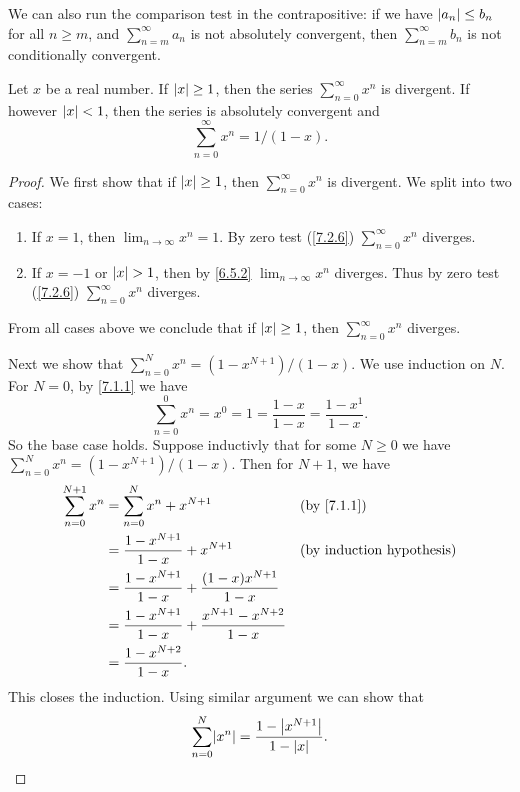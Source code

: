\begin{note}
  We can also run the comparison test in the contrapositive:
  if we have \(\left\lvert a_n\right\rvert \leq b_n\) for all \(n \geq m\), and \(\sum_{n = m}^\infty a_n\) is not absolutely convergent, then \(\sum_{n = m}^\infty b_n\) is not conditionally convergent.
\end{note}

\begin{lem}\label{7.3.3}
  Let \(x\) be a real number.
  If \(\left\lvert x\right\rvert \geq 1\), then the series \(\sum_{n = 0}^\infty x^n\) is divergent.
  If however \(\left\lvert x\right\rvert < 1\), then the series is absolutely convergent and
  \[
    \sum_{n = 0}^\infty x^n = 1 / (1 - x).
  \]
\end{lem}

\begin{proof}
  We first show that if \(\left\lvert x\right\rvert \geq 1\), then \(\sum_{n = 0}^\infty x^n\) is divergent.
  We split into two cases:
  \begin{enumerate}
    \item If \(x = 1\), then \(\lim_{n \to \infty} x^n = 1\). By zero test (\cref{7.2.6}) \(\sum_{n = 0}^\infty x^n\) diverges.
    \item If \(x = -1\) or \(\left\lvert x\right\rvert > 1\), then by \cref{6.5.2} \(\lim_{n \to \infty} x^n\) diverges.
          Thus by zero test (\cref{7.2.6}) \(\sum_{n = 0}^\infty x^n\) diverges.
  \end{enumerate}
  From all cases above we conclude that if \(\left\lvert x\right\rvert \geq 1\), then \(\sum_{n = 0}^\infty x^n\) diverges.

  Next we show that \(\sum_{n = 0}^N x^n = (1 - x^{N + 1}) / (1 - x)\).
  We use induction on \(N\).
  For \(N = 0\), by \cref{7.1.1} we have
  \[
    \sum_{n = 0}^0 x^n = x^0 = 1 = \dfrac{1 - x}{1 - x} = \dfrac{1 - x^1}{1 - x}.
  \]
  So the base case holds.
  Suppose inductivly that for some \(N \geq 0\) we have \(\sum_{n = 0}^N x^n = (1 - x^{N + 1}) / (1 - x)\).
  Then for \(N + 1\), we have
  \begin{align*}
    \sum_{n = 0}^{N + 1} x^n & = \sum_{n = 0}^N x^n + x^{N + 1}                                      &  & \text{(by \cref{7.1.1})}         \\
                             & = \dfrac{1 - x^{N + 1}}{1 - x} + x^{N + 1}                            &  & \text{(by induction hypothesis)} \\
                             & = \dfrac{1 - x^{N + 1}}{1 - x} + \dfrac{(1 - x) x^{N + 1}}{1 - x}                                           \\
                             & = \dfrac{1 - x^{N + 1}}{1 - x} + \dfrac{x^{N + 1} - x^{N + 2}}{1 - x}                                       \\
                             & = \dfrac{1 - x^{N + 2}}{1 - x}.
  \end{align*}
  This closes the induction.
  Using similar argument we can show that
  \[
    \sum_{n = 0}^N \abs{x^n} = \dfrac{1 - \abs{x^{N + 1}}}{1 - \abs{x}}.
  \]


\end{proof}
